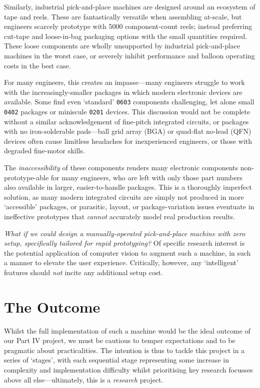 \documentclass[a4paper, 11pt]{article}
\begin{document}
Similarly, industrial pick-and-place machines are designed around an ecosystem of tape and reels.
These are fantastically versatile when assembling at-scale, but engineers scarcely prototype with 5000 component-count reels; instead preferring cut-tape and loose-in-bag packaging options with the small quantities required.
These loose components are wholly unsupported by industrial pick-and-place machines in the worst case, or severely inhibit performance and balloon operating costs in the best case.

For many engineers, this creates an impasse—many engineers struggle to work with the increasingly-smaller packages in which modern electronic devices are available.
Some find even `standard' \texttt{0603} components challenging, let alone small \texttt{0402} packages or miniscule \texttt{0201} devices.
This discussion would not be complete without a similar acknowledgement of fine-pitch integrated circuits, or packages with no iron-solderable pads—ball grid array (BGA) or quad-flat no-lead (QFN) devices often cause limitless headaches for inexperienced engineers, or those with degraded fine-motor skills.

The \emph{inaccessibility} of these components renders many electronic components non-prototype-able for many engineers, who are left with only those part numbers also available in larger, easier-to-handle packages.
This is a thoroughly imperfect solution, as many modern integrated circuits are simply not produced in more `accessible' packages, or parasitic, layout, or package-variation issues eventuate in ineffective prototypes that \emph{cannot} accurately model real production results.

\emph{What if we could design a manually-operated pick-and-place machine with zero setup, specifically tailored for rapid prototyping?}
Of specific research interest is the potential application of computer vision to augment such a machine, in such a manner to elevate the user experience.
Critically, however, any `intelligent' features should \emph{not} incite any additional setup cost.

\section{The Outcome}

Whilst the full implementation of such a machine would be the ideal outcome of our Part IV project, we must be cautious to temper expectations and to be pragmatic about practicalities.
The intention is thus to tackle this project in a series of `stages', with each sequential stage representing some increase in complexity and implementation difficulty whilst prioritising key research focusses above all else—ultimately, this is a \emph{research} project.
\end{document}
